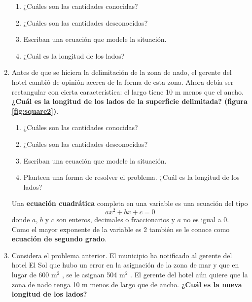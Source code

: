 \documentclass[11pt]{book}
\begin{document}
\begin{enumerate}
        \begin{enumerate}
          \item ¿Cuáles son las cantidades conocidas?
          \item ¿Cuáles son las cantidades desconocidas?
          \item Escriban una ecuación que modele la situación.
          \item ¿Cuál es la longitud de los lados?
        \end{enumerate}

  \item Antes de que se hiciera la delimitación de la zona de nado, el gerente del
        hotel cambió de opinión acerca de la forma de esta zona. Ahora debía
        ser rectangular con cierta característica: el largo tiene 10 m menos que
        el ancho. \textbf{¿Cuál es la longitud de los lados de la superficie delimitada?
          (figura \ref{fig:square2})}.\\
        \begin{enumerate}
          \item ¿Cuáles son las cantidades conocidas?
          \item ¿Cuáles son las cantidades desconocidas?
          \item Escriban una ecuación que modele la situación.
          \item Planteen una forma de resolver el problema. ¿Cuál es la longitud de los
                lados?
        \end{enumerate}

        \begin{boxH}
          Una \textbf{ecuación cuadrática} completa en una variable es una ecuación del tipo
          \begin{equation}
            ax^2 + bx + c = 0
          \end{equation}
          donde $a$, $b$ y $c$ son enteros, decimales o fraccionarios y $a$ no es igual a 0. Como el
          mayor exponente de la variable es 2 también se
          le conoce como \textbf{ecuación de segundo grado}.
        \end{boxH}

  \item Considera el problema anterior. El municipio ha
        notificado al gerente del hotel El Sol que hubo un error en la asignación de la zona
        de mar y que en lugar de 600 m$^2$ , se le asignan 504 m$^2$ . El gerente del hotel aún
        quiere que la zona de nado tenga 10 m menos de largo que de ancho. \textbf{¿Cuál es la
          nueva longitud de los lados?}


\end{enumerate}
\end{document}
